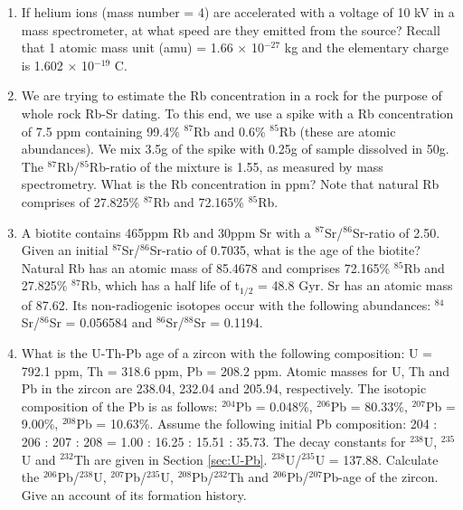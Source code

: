 \documentclass{book}
\begin{document}
\begin{enumerate}

\item If helium ions (mass number = 4) are accelerated with a voltage
  of 10 kV in a mass spectrometer, at what speed are they emitted from
  the source? Recall that 1 atomic mass unit (amu) = 1.66 $\times$
  10$^{-27}$ kg and the elementary charge is 1.602 $\times$ 10$^{-19}$
  C. 

\item We are trying to estimate the Rb concentration in a rock for the
  purpose of whole rock Rb-Sr dating. To this end, we use a spike with
  a Rb concentration of 7.5 ppm containing 99.4\% $^{87}$Rb and 0.6\%
  $^{85}$Rb (these are atomic abundances). We mix 3.5g of the spike
  with 0.25g of sample dissolved in 50g. The $^{87}$Rb/$^{85}$Rb-ratio
  of the mixture is 1.55, as measured by mass spectrometry. What is
  the Rb concentration in ppm? Note that natural Rb comprises of
  27.825\% $^{87}$Rb and 72.165\% $^{85}$Rb.  

\item A biotite contains 465ppm Rb and 30ppm Sr with a
  $^{87}$Sr/$^{86}$Sr-ratio of 2.50.  Given an initial
  $^{87}$Sr/$^{86}$Sr-ratio of 0.7035, what is the age of the biotite?
  Natural Rb has an atomic mass of 85.4678 and comprises 72.165\%
  $^{85}$Rb and 27.825\% $^{87}$Rb, which has a half life of t$_{1/2}$
  = 48.8 Gyr. Sr has an atomic mass of 87.62. Its non-radiogenic
  isotopes occur with the following abundances: $^{84}$Sr/$^{86}$Sr =
  0.056584 and $^{86}$Sr/$^{88}$Sr = 0.1194.

\item What is the U-Th-Pb age of a zircon with the following
  composition: U = 792.1 ppm, Th = 318.6 ppm, Pb = 208.2 ppm. Atomic
  masses for U, Th and Pb in the zircon are 238.04, 232.04 and 205.94,
  respectively. The isotopic composition of the Pb is as follows:
  $^{204}$Pb = 0.048\%, $^{206}$Pb = 80.33\%, $^{207}$Pb = 9.00\%,
  $^{208}$Pb = 10.63\%. Assume the following initial Pb composition:
  204 : 206 : 207 : 208 = 1.00 : 16.25 : 15.51 : 35.73. The decay
  constants for $^{238}$U, $^{235}$U and $^{232}$Th are given in
  Section \ref{sec:U-Pb}. $^{238}$U/$^{235}$U = 137.88. Calculate the
  $^{206}$Pb/$^{238}$U, $^{207}$Pb/$^{235}$U, $^{208}$Pb/$^{232}$Th
  and $^{206}$Pb/$^{207}$Pb-age of the zircon. Give an account of its
  formation history. \\ 


\end{enumerate}
\end{document}
